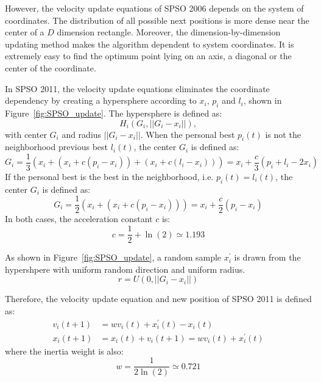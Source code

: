 However, the velocity update equations of SPSO 2006 depends on the system of coordinates.
The distribution of all possible next positions is more dense near the center of a $D$ dimension rectangle.
Moreover, the dimension-by-dimension updating method makes the algorithm dependent to system coordinates.
It is extremely easy to find the optimum point lying on an axis, a diagonal or the center of the coordinate.

In SPSO 2011, the velocity update equations eliminates the coordinate dependency by creating a hypersphere according to $x_i$, $p_i$ and $l_i$, shown in Figure~\ref{fig:SPSO_update}.
The hypersphere is defined as:
\begin{displaymath}
H_i(G_i, ||G_i - x_i||),
\end{displaymath}
with center $G_i$ and radius $||G_i - x_i||$.
When the personal best $p_i(t)$ is not the neighborhood previous best $l_i(t)$, the center $G_i$ is defined as:
\begin{displaymath}
G_i = \frac{1}{3} (x_i + (x_i + c(p_i - x_i)) + (x_i + c(l_i - x_i))) = x_i + \frac{c}{3}(p_i + l_i - 2x_i) 
\end{displaymath}
If the personal best is the best in the neighborhood, i.e. $p_i(t) = l_i(t)$, the center $G_i$ is defined as:
\begin{displaymath}
G_i = \frac{1}{2} (x_i + (x_i + c(p_i - x_i))) = x_i + \frac{c}{2}(p_i - x_i)
\end{displaymath}
In both cases, the acceleration constant $c$ is:
\begin{displaymath}
c = \frac{1}{2} + \ln(2) \simeq 1.193
\end{displaymath}

As shown in Figure~\ref{fig:SPSO_update}, a random sample $x^{'}_{i}$ is drawn from the hypershpere with uniform random direction and uniform radius.
\begin{displaymath}
r = U(0, ||G_i - x_i||)
\end{displaymath} 

Therefore, the velocity update equation and new position of SPSO 2011 is defined as:
\begin{align*}
v_i(t+1) &= wv_i(t) + x_{i}^{'}(t) - x_i(t) \\
x_i(t+1) &= x_i(t) + v_i(t+1) = wv_i(t) + x_{i}^{'}(t) 
\end{align*} 
where the inertia weight is also:
\begin{displaymath}
w = \frac{1}{2\ln(2)} \simeq 0.721
\end{displaymath} 


